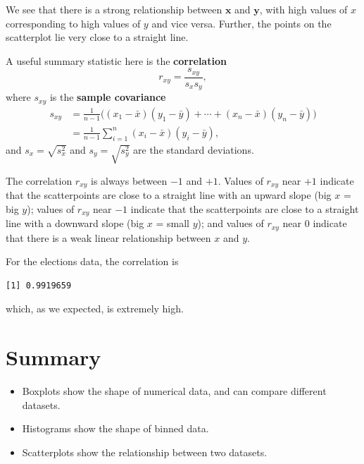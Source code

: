 \documentclass[
  a4paper,
]{book}
\newenvironment{Shaded}{\begin{snugshade}}{\end{snugshade}}
\newcommand{\FunctionTok}[1]{\textcolor[rgb]{0.13,0.29,0.53}{\textbf{#1}}}
\newcommand{\NormalTok}[1]{#1}
\newcommand{\SpecialCharTok}[1]{\textcolor[rgb]{0.81,0.36,0.00}{\textbf{#1}}}
\providecommand{\tightlist}{%
  \setlength{\itemsep}{0pt}\setlength{\parskip}{0pt}}
\theoremstyle{definition}
\theoremstyle{definition}
\theoremstyle{definition}
\theoremstyle{definition}
\theoremstyle{remark}
\begin{document}
We see that there is a strong relationship between \(\mathbf x\) and \(\mathbf y\), with high values of \(x\) corresponding to high values of \(y\) and vice versa. Further, the points on the scatterplot lie very close to a straight line.

A useful summary statistic here is the \textbf{correlation}
\[ r_{xy} = \frac{s_{xy}}{s_x s_y} , \]
where \(s_{xy}\) is the \textbf{sample covariance}
\begin{align*}
s_{xy} &= \frac{1}{n-1} \big( (x_1 - \bar x)(y_1 - \bar y) + \cdots + (x_n - \bar x)(y_n - \bar y) \big) \\
  &= \frac{1}{n-1} \sum_{i=1}^n (x_i - \bar x)(y_i - \bar y) ,
\end{align*}
and \(s_x = \sqrt{s_x^2}\) and \(s_y = \sqrt{s_y^2}\) are the standard deviations.

The correlation \(r_{xy}\) is always between \(-1\) and \(+1\). Values of \(r_{xy}\) near \(+1\) indicate that the scatterpoints are close to a straight line with an upward slope (big \(x\) = big \(y\)); values of \(r_{xy}\) near \(-1\) indicate that the scatterpoints are close to a straight line with a downward slope (big \(x\) = small \(y\)); and values of \(r_{xy}\) near 0 indicate that there is a weak linear relationship between \(x\) and \(y\).

For the elections data, the correlation is

\begin{Shaded}
\end{Shaded}

\begin{verbatim}
[1] 0.9919659
\end{verbatim}

which, as we expected, is extremely high.

\hypertarget{summary-02}{%
\section*{Summary}\label{summary-02}}

\begin{itemize}
\tightlist
\item
  Boxplots show the shape of numerical data, and can compare different datasets.
\item
  Histograms show the shape of binned data.
\item
  Scatterplots show the relationship between two datasets.
\end{itemize}
\end{document}
